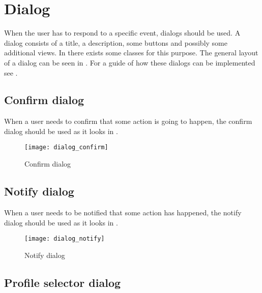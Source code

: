 
\chapter{Dialog}
\label{cha:dialog}

When the user has to respond to a specific event, dialogs should be used. A dialog consists of a title, a description, some buttons and possibly some additional views. In \gc there exists some classes for this purpose. The general layout of a dialog can be seen in . For a guide of how these dialogs can be implemented see .

\section{Confirm dialog}
\label{sec:confirm_dialog}

When a user needs to confirm that some action is going to happen, the confirm dialog should be used as it looks in .

\begin{figure}[h]
	\centering
	\texttt{[image: dialog\_confirm]}
	\caption{Confirm dialog}
	\label{fig:confirm_dialog}
\end{figure}
\FloatBarrier

\section{Notify dialog}
\label{sec:notify_dialog}

When a user needs to be notified that some action has happened, the notify dialog should be used as it looks in .
\begin{figure}[h]
	\centering
	\texttt{[image: dialog\_notify]}
	\caption{Notify dialog}
	\label{fig:notify_dialog}
\end{figure}
\FloatBarrier

\section{Profile selector dialog}
\label{sec:profileselector_dialog}

